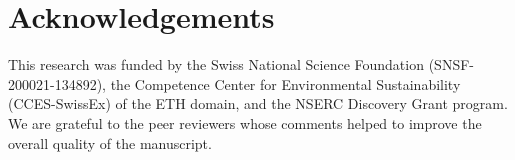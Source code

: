 \section{Acknowledgements}
%
This research was funded by the Swiss National Science Foundation (SNSF-200021-134892), the Competence Center for Environmental Sustainability (CCES-SwissEx) of the ETH domain, and the NSERC Discovery Grant program. 
We are grateful to the peer reviewers whose comments helped to improve the overall quality of the manuscript.













